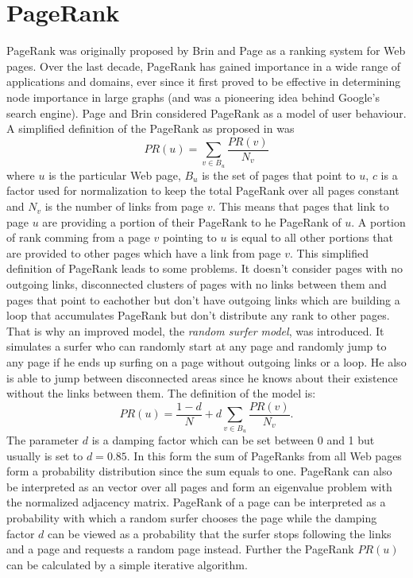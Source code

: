 \documentclass[11pt,oneside]{book}
\let\Oldsection\section
\renewcommand{\section}{\FloatBarrier\Oldsection}
\begin{document}
\section{PageRank}
\label{sec:pagerank_related}
PageRank was originally proposed by Brin and Page \citep{page1999pagerank} as a ranking system
for Web pages. Over the last decade, PageRank has gained importance in a wide range of applications and domains, ever since it first proved to be  effective in determining node importance in large graphs (and was a pioneering idea behind Google's search engine). Page and Brin considered PageRank as a model of user behaviour.
\noindent
A simplified definition of the PageRank as proposed in \citep{page1999pagerank} was
\begin{equation}
 PR(u)=\sum_{v\in B_u}\frac{PR(v)}{N_v}
\end{equation}
where $u$ is the particular Web page, $B_u$ is the set of pages that point to $u$, $c$ is a factor used for normalization to keep the total PageRank over all pages constant and $N_v$ is the number of links from page $v$. This means that pages that link to page $u$ are providing a portion of their PageRank to he PageRank of $u$. A portion of rank comming from a page $v$ pointing to $u$ is equal to all other portions that are provided to other pages which have a link from page $v$. This simplified definition of PageRank leads to some problems. It doesn't consider pages with no outgoing links, disconnected clusters of pages with no links between them and pages that point to eachother but don't have outgoing links which are building a loop that accumulates PageRank but don't distribute any rank to other pages. That is why an improved model, the \textit{random surfer model}, was introduced. It simulates a surfer who can randomly start at any page and randomly jump to any page if he ends up surfing on a page without outgoing links or a loop. He also is able to jump between disconnected areas since he knows about their existence without the links between them. The definition of the model is:
\begin{equation}
 PR(u) = \frac{1-d}{N}+d\sum_{v\in B_u}\frac{PR(v)}{N_v}.
\end{equation}
The parameter $d$ is a damping factor which can be set between 0 and 1 but usually is set to $d=0.85$. In this form the sum of PageRanks from all Web pages form a probability distribution since the sum equals to one. PageRank can also be interpreted as an vector over all pages and form an eigenvalue problem with the normalized adjacency matrix. PageRank of a page can be interpreted as a probability with which a random surfer chooses the page while the damping factor $d$ can be viewed as a probability that the surfer stops following the links and a page and requests a random page instead. Further the PageRank $PR(u)$ can be calculated by a simple iterative algorithm.\\
\end{document}
